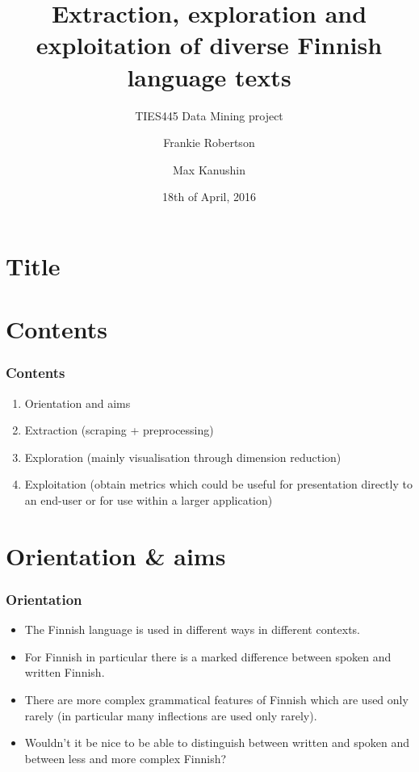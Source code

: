 \documentclass{beamer}
\title[Finnish language text mining]{Extraction, exploration and exploitation of diverse Finnish language texts}
\subtitle{TIES445 Data Mining project}
\author[Robertson \& Kanushin]{Frankie Robertson\inst{1} \and Max Kanushin\inst{2}}
\institute[JYU, LETI]{\inst{1} University of Jyväskylä \and%
                      \inst{2} Saint Petersburg State Electrotechnical University}
\date{18th of April, 2016}
\begin{document}
\section{Title}
\begin{frame}
  \titlepage{}
\end{frame}

\section{Contents}
\begin{frame}
\frametitle{Contents}
\begin{enumerate}
  \item Orientation and aims\pause{}
  \item Extraction (scraping + preprocessing)\pause{}
  \item Exploration (mainly visualisation through dimension reduction)\pause{}
  \item Exploitation (obtain metrics which could be useful for presentation directly to an end-user or for use within a larger application)
\end{enumerate}

\end{frame}

\section{Orientation \& aims}
\begin{frame}
\frametitle{Orientation}

\begin{itemize}
  \item The Finnish language is used in different ways in different contexts.\pause{}

  \item For Finnish in particular there is a marked difference between spoken and
        written Finnish.\pause{}

  \item There are more complex grammatical features of Finnish which are used
        only rarely (in particular many inflections are used only rarely).\pause{}

  \item Wouldn't it be nice to be able to distinguish between written and
        spoken and between less and more complex Finnish?
\end{itemize}

\end{frame}
\end{document}
